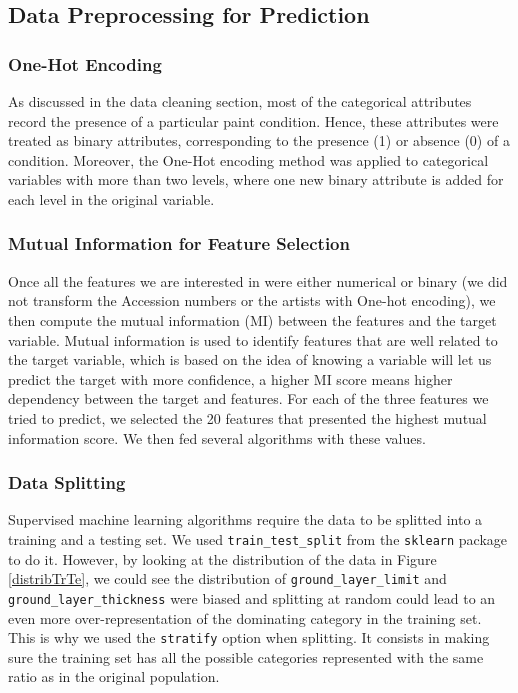 \documentclass[11pt, oneside]{article}
\begin{document}
\subsection{Data Preprocessing for Prediction}
\subsubsection{One-Hot Encoding}
As discussed in the data cleaning section, most of the categorical attributes record the presence of a particular paint condition. Hence, these attributes were treated as binary attributes, corresponding to the presence (1) or absence (0) of a condition. Moreover, the One-Hot encoding method was applied to categorical variables with more than two levels, where one new binary attribute is added for each level in the original variable.

\subsubsection{Mutual Information for Feature Selection}
Once all the features we are interested in were either numerical or binary (we did not transform the Accession numbers or the artists with One-hot encoding), we then compute the mutual information (MI) between the features and the target variable. Mutual information is used to identify features that are well related to the target variable, which is based on the idea of knowing a variable will let us predict the target with more confidence, a higher MI score means higher dependency between the target and features.
\bigbreak
\noindent For each of the three features we tried to predict, we selected the 20 features that presented the highest mutual information score. We then fed several algorithms with these values.

\subsubsection{Data Splitting}
Supervised machine learning algorithms require the data to be splitted into a training and a testing set. We used \texttt{train\_test\_split} from the \texttt{sklearn} package to do it. However, by looking at the distribution of the data in Figure \ref{distribTrTe}, we could see the distribution of \texttt{ground\_layer\_limit} and \texttt{ground\_layer\_thickness} were biased and splitting at random could lead to an even more over-representation of the dominating category in the training set. This is why we used the \texttt{stratify} option when splitting. It consists in making sure the training set has all the possible categories represented with the same ratio as in the original population.
\end{document}
